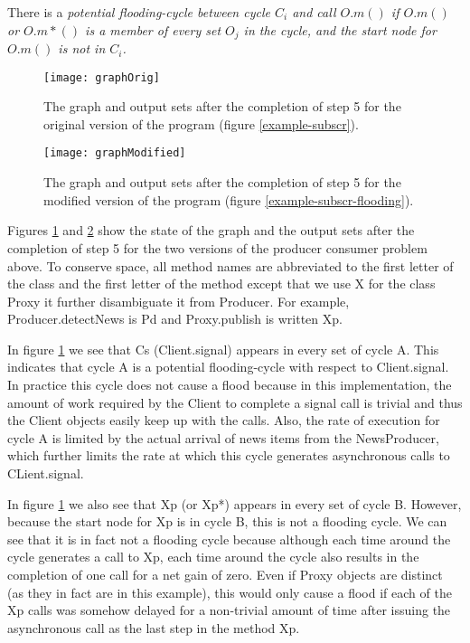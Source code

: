 \documentclass[12pt]{article}%
\begin{document}
\begin{definition}
\label{potential-flooding-cycle}
There is a \em{potential flooding-cycle} between cycle $C_i$ and call $O.m()$ if 
$O.m()$ or $O.m*()$ is a member of every set $O_j$ in the cycle, and
the start node for $O.m()$ is not in $C_i$.
\end{definition}



\begin{figure}[t]
\texttt{[image: graphOrig]}
\caption{\label{graph-orig}
The graph and output sets after the completion of step 5 for the original version of the program (figure \ref{example-subscr}).
}
\end{figure}

\begin{figure}[t]
\texttt{[image: graphModified]}
\caption{\label{graph-modified}
The graph and output sets after the completion of step 5 for the modified version of the program (figure \ref{example-subscr-flooding}).
}
\end{figure}

Figures \ref{graph-orig} and \ref{graph-modified} show the state of the graph and the output sets
after the completion of step 5 for the two versions of the producer consumer problem above. To conserve space, all method names are abbreviated to the
first letter of the class and the first letter of the method except that we use X for the class Proxy it further disambiguate it from Producer. 
For example, Producer.detectNews is Pd and Proxy.publish is written Xp.

In figure \ref{graph-orig} we see that Cs (Client.signal) appears in every set of cycle A. This indicates that cycle A is a potential flooding-cycle
with respect to Client.signal. In practice this cycle does not cause a flood because in this implementation, the amount of work required by the
Client to complete a signal call is trivial and thus the Client objects easily keep up with the calls. Also, the rate of execution for cycle A is
limited by the actual arrival of news items from the NewsProducer, which further limits the rate at which this cycle generates asynchronous calls to
CLient.signal.

In figure \ref{graph-orig} we also see that Xp (or Xp*) appears in every set of cycle B. However, because
the start node for Xp is in cycle B, this is not a flooding cycle. We can see that it is in fact not a flooding cycle 
because although each time around the cycle generates a call to Xp, each time around the cycle also results in the completion of
one call for a net gain of zero. Even if Proxy objects are distinct (as they in fact are in this example), this would only cause 
a flood if each of the Xp calls was somehow delayed for a non-trivial amount of time after issuing the asynchronous call as the 
last step in the method Xp.
\end{document}
